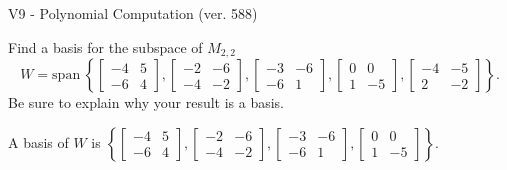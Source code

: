 \begin{exercise}
  \begin{exerciseTitle}V9 - Polynomial Computation (ver. 588)\end{exerciseTitle}
  \begin{exerciseStatement}
    Find a basis for the subspace of \(M_{2,2}\) 
\[W=\mathrm{span}\ \left\{\left[\begin{array}{cc}
-4 & 5 \\
-6 & 4
\end{array}\right] , \left[\begin{array}{cc}
-2 & -6 \\
-4 & -2
\end{array}\right] , \left[\begin{array}{cc}
-3 & -6 \\
-6 & 1
\end{array}\right] , \left[\begin{array}{cc}
0 & 0 \\
1 & -5
\end{array}\right] , \left[\begin{array}{cc}
-4 & -5 \\
2 & -2
\end{array}\right]\right\}.\]
 Be sure to explain why your result is a basis.


  \end{exerciseStatement}
  \begin{exerciseAnswer}
   A basis of \(W\) is  \(\left\{\left[\begin{array}{cc}
-4 & 5 \\
-6 & 4
\end{array}\right] , \left[\begin{array}{cc}
-2 & -6 \\
-4 & -2
\end{array}\right] , \left[\begin{array}{cc}
-3 & -6 \\
-6 & 1
\end{array}\right] , \left[\begin{array}{cc}
0 & 0 \\
1 & -5
\end{array}\right]\right\}\).
  


  \end{exerciseAnswer}
\end{exercise}
